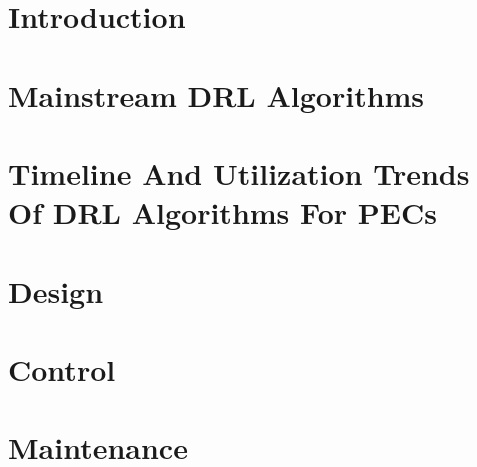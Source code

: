 \documentclass[journal]{IEEEtran}
\begin{document}

\maketitle
\IEEEpeerreviewmaketitle


 


\section{Introduction}
\label{sec_intro}


\section{Mainstream DRL Algorithms}
\label{sec:mainstream_drl}


\section{Timeline And Utilization Trends Of DRL Algorithms For PECs}
\label{sec_timeline}


\section{Design}
\label{sec_prop}


\section{Control}
\label{sec_control}
%


\section{Maintenance}
\label{sec_maintenance}


% 
% 
\end{document}
